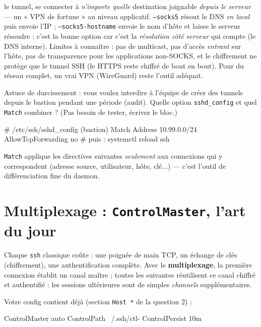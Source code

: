 \documentclass[a4paper,10pt]{exam}
\begin{document}
\begin{questions}
\begin{solution}
le tunnel, se connecter à \emph{n'importe quelle} destination joignable \emph{depuis le
serveur} — un « VPN de fortune » au niveau applicatif.
\texttt{--socks5} résout le DNS \emph{en local} puis envoie l'IP ;
\texttt{--socks5-hostname} envoie le nom d'hôte et laisse le serveur résoudre : c'est la
bonne option car c'est la \emph{résolution côté serveur} qui compte (le DNS interne).
Limites à connaître : pas de multicast, pas d'accès \emph{entrant} sur l'hôte, pas de
transparence pour les applications non-SOCKS, et le chiffrement ne protège que le tunnel
SSH (le HTTPS reste chiffré de bout en bout). Pour du réseau complet, un vrai VPN
(WireGuard) reste l'outil adéquat.
\end{solution}
\question Astuce de durcissement : vous voulez interdire à l'équipe de créer des tunnels
depuis le bastion pendant une période (audit). Quelle option \texttt{sshd\_config} et quel
\texttt{Match} combiner ? (Pas besoin de tester, écrivez le bloc.)
\begin{solution}
\begin{bashcode}
# /etc/ssh/sshd_config (bastion)
Match Address 10.99.0.0/24
    AllowTcpForwarding no
# puis :
systemctl reload ssh
\end{bashcode}
\texttt{Match} applique les directives suivantes \emph{seulement} aux connexions qui y
correspondent (adresse source, utilisateur, hôte, clé...) — c'est l'outil de
différenciation fine du daemon.
\end{solution}
\end{questions}

\section{Multiplexage : \texttt{ControlMaster}, l'art du jour}

Chaque \texttt{ssh} classique coûte : une poignée de main TCP, un échange de clés
(chiffrement), une authentification complète. Avec le \textbf{multiplexage}, la première
connexion établit un canal maître ; toutes les suivantes réutilisent ce canal chiffré et
authentifié : les sessions ultérieures sont de simples \emph{channels} supplémentaires.

Votre config contient déjà (section \texttt{Host *} de la question 2) :
\begin{bashcode}
ControlMaster auto
ControlPath ~/.ssh/ctl-%
ControlPersist 10m
\end{bashcode}
\end{document}
